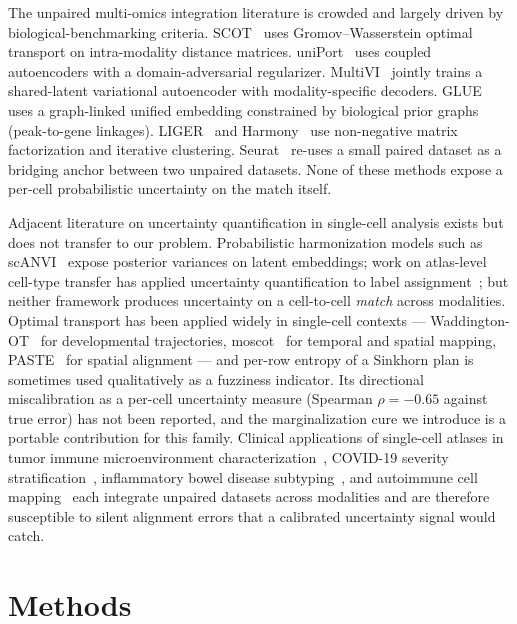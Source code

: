 \documentclass[pmlr]{jmlr}
\begin{document}
The unpaired multi-omics integration literature is crowded and largely driven by biological-benchmarking criteria. SCOT~\citep{demetci2022scot} uses Gromov--Wasserstein optimal transport on intra-modality distance matrices. uniPort~\citep{cao2022uniport} uses coupled autoencoders with a domain-adversarial regularizer. MultiVI~\citep{ashuach2023multivi} jointly trains a shared-latent variational autoencoder with modality-specific decoders. GLUE~\citep{cao2022multi} uses a graph-linked unified embedding constrained by biological prior graphs (peak-to-gene linkages). LIGER~\citep{welch2019liger} and Harmony~\citep{korsunsky2019harmony} use non-negative matrix factorization and iterative clustering. Seurat~\citep{hao2024seurat5} re-uses a small paired dataset as a bridging anchor between two unpaired datasets. None of these methods expose a per-cell probabilistic uncertainty on the match itself.

Adjacent literature on uncertainty quantification in single-cell analysis exists but does not transfer to our problem. Probabilistic harmonization models such as scANVI~\citep{xu2021scanvi} expose posterior variances on latent embeddings; work on atlas-level cell-type transfer has applied uncertainty quantification to label assignment~\citep{engelmann2022uncertainty}; but neither framework produces uncertainty on a cell-to-cell \emph{match} across modalities. Optimal transport has been applied widely in single-cell contexts --- Waddington-OT~\citep{schiebinger2019waddington} for developmental trajectories, moscot~\citep{klein2025moscot} for temporal and spatial mapping, PASTE~\citep{zeira2022paste} for spatial alignment --- and per-row entropy of a Sinkhorn plan is sometimes used qualitatively as a fuzziness indicator. Its directional miscalibration as a per-cell uncertainty measure (Spearman $\rho = -0.65$ against true error) has not been reported, and the marginalization cure we introduce is a portable contribution for this family. Clinical applications of single-cell atlases in tumor immune microenvironment characterization~\citep{zheng2021pancancer}, COVID-19 severity stratification~\citep{stephenson2021single}, inflammatory bowel disease subtyping~\citep{smillie2019intra}, and autoimmune cell mapping~\citep{zhang2021macrophage} each integrate unpaired datasets across modalities and are therefore susceptible to silent alignment errors that a calibrated uncertainty signal would catch.

\section{Methods}
\label{sec:methods}
\end{document}
